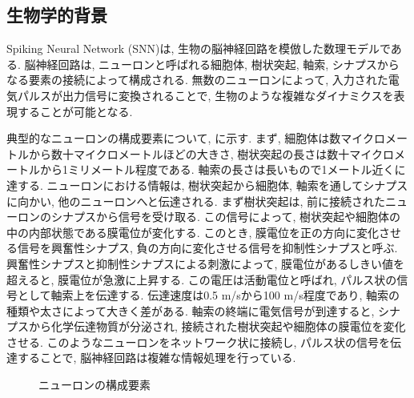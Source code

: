 \subsection{生物学的背景}
Spiking Neural Network (SNN)は, 生物の脳神経回路を模倣した数理モデルである.
脳神経回路は, ニューロンと呼ばれる細胞体, 樹状突起, 軸索, シナプスからなる要素の接続によって構成される.
無数のニューロンによって, 入力された電気パルスが出力信号に変換されることで, 生物のような複雑なダイナミクスを表現することが可能となる.

典型的なニューロンの構成要素について, に示す.
まず, 細胞体は数マイクロメートルから数十マイクロメートルほどの大きさ, 樹状突起の長さは数十マイクロメートルから1ミリメートル程度である.
軸索の長さは長いもので1メートル近くに達する.
ニューロンにおける情報は, 樹状突起から細胞体, 軸索を通してシナプスに向かい, 他のニューロンへと伝達される.
まず樹状突起は, 前に接続されたニューロンのシナプスから信号を受け取る.
この信号によって, 樹状突起や細胞体の中の内部状態である膜電位が変化する.
このとき, 膜電位を正の方向に変化させる信号を興奮性シナプス, 負の方向に変化させる信号を抑制性シナプスと呼ぶ.
興奮性シナプスと抑制性シナプスによる刺激によって, 膜電位があるしきい値を超えると, 膜電位が急激に上昇する.
この電圧は活動電位と呼ばれ, パルス状の信号として軸索上を伝達する.
伝達速度は0.5 m/sから100 m/s程度であり, 軸索の種類や太さによって大きく差がある.
軸索の終端に電気信号が到達すると, シナプスから化学伝達物質が分泌され, 接続された樹状突起や細胞体の膜電位を変化させる.
このようなニューロンをネットワーク状に接続し, パルス状の信号を伝達することで, 脳神経回路は複雑な情報処理を行っている.

\begin{figure}[htbp]
    \centering
    
    \caption{ニューロンの構成要素}
    \label{fig:neuron}
\end{figure}
